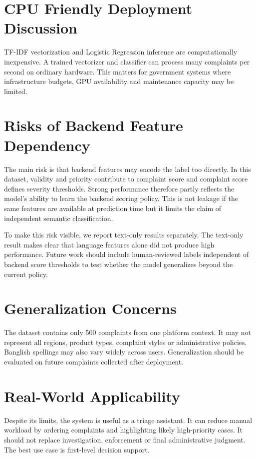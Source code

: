 \documentclass[12pt,a4paper,openany]{book}
\begin{document}
\section{CPU Friendly Deployment Discussion}
TF-IDF vectorization and Logistic Regression inference are computationally inexpensive. A trained vectorizer and classifier can process many complaints per second on ordinary hardware. This matters for government systems where infrastructure budgets, GPU availability and maintenance capacity may be limited.

\section{Risks of Backend Feature Dependency}
The main risk is that backend features may encode the label too directly. In this dataset, validity and priority contribute to complaint score and complaint score defines severity thresholds. Strong performance therefore partly reflects the model's ability to learn the backend scoring policy. This is not leakage if the same features are available at prediction time but it limits the claim of independent semantic classification.

To make this risk visible, we report text-only results separately. The text-only result makes clear that language features alone did not produce high performance. Future work should include human-reviewed labels independent of backend score thresholds to test whether the model generalizes beyond the current policy.

\section{Generalization Concerns}
The dataset contains only 500 complaints from one platform context. It may not represent all regions, product types, complaint styles or administrative policies. Banglish spellings may also vary widely across users. Generalization should be evaluated on future complaints collected after deployment.

\section{Real-World Applicability}
Despite its limits, the system is useful as a triage assistant. It can reduce manual workload by ordering complaints and highlighting likely high-priority cases. It should not replace investigation, enforcement or final administrative judgment. The best use case is first-level decision support.
\end{document}
